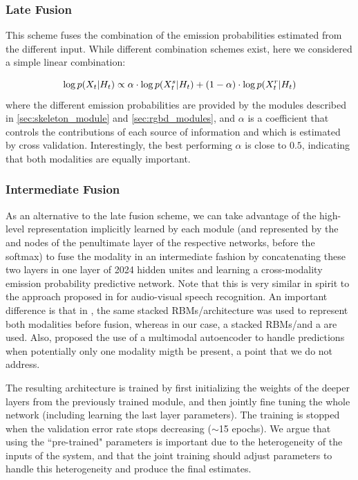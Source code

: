 \subsubsection{Late Fusion}
%
This scheme fuses the combination of the emission probabilities estimated from the different input.
While different combination schemes exist, here we considered a simple linear combination:

\begin{equation}
\log p(X_t | H_t)  \propto  \alpha \cdot \log p(X_t^s | H_t) + (1-\alpha)\cdot \log p(X_t^r | H_t)
\end{equation}
where the different emission probabilities are provided by the modules described in \ref{sec:skeleton_module} and \ref{sec:rgbd_modules},
and $\alpha$ is a coefficient that controls the contributions of each source of information and which is estimated by cross validation.
Interestingly, the best performing $\alpha$ is close to $0.5$, indicating that both modalities are equally important.


\subsubsection{Intermediate Fusion}
\label{early_fusion}

As an alternative to the late fusion scheme, we can take advantage of the high-level representation implicitly learned by each module
(and represented by the \highSK and \highRGBD nodes of the penultimate layer of the respective networks, before the softmax)
to fuse the modality in an intermediate fashion by concatenating these two layers in one layer of 2024 hidden unites
and learning a cross-modality emission probability predictive network.
%
Note that this is very similar in spirit to the approach proposed in \cite{Ngiam2011multimodal}
for audio-visual speech recognition.
%
An important difference is that in \cite{Ngiam2011multimodal}, the same stacked RBMs/\DBN architecture was used
to represent both modalities before fusion, whereas in our case, a stacked RBMs/\DBN and a \ThreeDCNN are used.
%
Also, \cite{Ngiam2011multimodal} proposed the use of a multimodal autoencoder to handle predictions when potentially
only one modality migth be present, a point that we do not address.

The resulting architecture is trained by first initializing the weights of the deeper layers from the previously trained module,
and then jointly fine tuning the whole network (including learning the last layer parameters).
The training is stopped when the validation error rate stops decreasing ($\sim$15 epochs).
%
We argue that using the ``pre-trained" parameters is important due to the heterogeneity of the inputs of the system,
and that the joint training should adjust parameters to handle  this heterogeneity and produce the final estimates.


